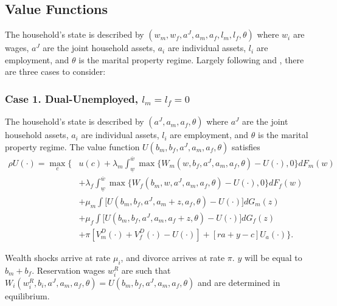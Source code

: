 \documentclass[11pt]{article}
\begin{document}
\subsection*{Value Functions}
The household's state is described by $(w_m, w_f, a^J, a_m, a_f, l_m, l_f, \theta)$ where $w_i$ are wages, $a^J$ are the joint household assets, $a_i$ are individual assets, $l_i$ are employment, and $\theta$ is the marital property regime. Largely following \cite{GULER2012352} and \cite{pilossoph_wee}, there are three cases to consider:


\subsubsection*{Case 1. Dual-Unemployed, $l_m = l_f = 0$}
The household's state is described by $(a^J, a_m, a_f,\theta)$ where $a^J$ are the joint household assets, $a_i$ are individual assets, $l_i$ are employment, and $\theta$ is the marital property regime.  The value function $U(b_m,b_f,a^J, a_m, a_f,\theta)$ satisfies
\begin{align*}
    \rho U(\cdot)= \max_c\bigg\{&u(c)+\lambda_m\int_{\underline{w}}^{\overline{w}}\max\big\{W_m(w,b_f,a^J,a_m,a_f,\theta)-U(\cdot),0\big\}dF_m(w)\\&+\lambda_f\int_{\underline{w}}^{\overline{w}}\max\big\{W_f(b_m,w,a^J,a_m,a_f,\theta)-U(\cdot),0\big\}dF_f(w)\\&+\mu_m\int\big[U(b_m,b_f,a^J,a_m+z,a_f,\theta)-U(\cdot)\big]dG_m(z)\\&+\mu_f\int\big[U(b_m,b_f,a^J,a_m,a_f+z,\theta)-U(\cdot)\big]dG_f(z)\\&+\pi\left[V_m^D(\cdot)+V_f^D(\cdot)-U(\cdot)\right] + [ra + y - c]U_a(\cdot) \bigg\}.
\end{align*}

Wealth shocks arrive at rate $\mu_i$, and divorce arrives at rate $\pi$. $y$ will be equal to $b_m+ b_f$. Reservation wages $w_i^R$ are such that $W_i(w_i^R,b_i,a^J,a_m,a_f,\theta)=U(b_m,b_f,a^J,a_m,a_f,\theta)$ and are determined in equilibrium. 
\end{document}
